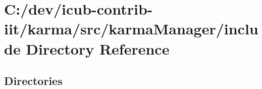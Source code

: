 \section{C\+:/dev/icub-\/contrib-\/iit/karma/src/karma\+Manager/include Directory Reference}
\label{dir_db5aab25642573dc60c61c7a424e232a}
\subsection*{Directories}
\begin{DoxyCompactItemize}
\end{DoxyCompactItemize}
